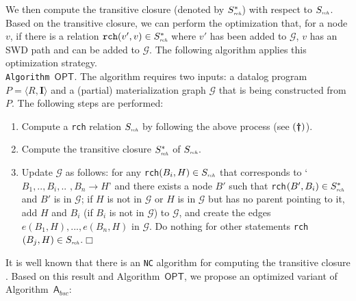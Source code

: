 \documentclass[final,1p,times]{elsarticle}
\begin{document}
We then compute the transitive closure (denoted by $S^*_{\textit{\tiny rch}}$) with respect to
$S_{\textit{\tiny rch}}$. Based on the transitive closure, we can perform the optimization that,
for a node $v$, if there is a relation $\texttt{rch}(v',v)\in S^*_{\textit{\tiny rch}}$
where $v'$ has been added to $\mathcal{G}$, $v$ has an SWD path and can be added to $\mathcal{G}$.
The following algorithm applies this optimization strategy.\\

\noindent\texttt{Algorithm~$\mathsf{OPT}$}. The algorithm requires two inputs:
a datalog program $P=\langle R, \textbf{I}\rangle$ and a (partial) materialization graph $\mathcal{G}$ that is
being constructed from $P$. The following steps are performed:
\begin{enumerate}[leftmargin=6ex,label=(\textbf{\roman*})]
\item Compute a \texttt{rch} relation $S_{\textit{\tiny rch}}$ by following the above process (see $(\textbf{\dag})$).\label{rch}
\item Compute the transitive closure $S^*_{\textit{\tiny rch}}$ of $S_{\textit{\tiny rch}}$.\label{transClos}
\item Update $\mathcal{G}$ as follows: for any \texttt{rch}$(B_i,H)\in S_{\textit{\tiny rch}}$
that corresponds to `$B_1,..,B_i,..$ $,B_n\rightarrow H$'
    and there exists a node $B'$ such that \texttt{rch}$(B',B_i)\in S^*_{\textit{\tiny rch}}$ and $B'$ is
    in $\mathcal{G}$; if $H$ is not in $\mathcal{G}$ or $H$ is in $\mathcal{G}$ but has no parent pointing
    to it, add $H$ and $B_i$ (if $B_i$ is not in $\mathcal{G}$) to $\mathcal{G}$, and create the edges
    $e(B_1, H),...,e(B_n, H)$ in $\mathcal{G}$. Do nothing for other statements
    \texttt{rch}$(B_j,H)\in S_{\textit{\tiny rch}}$.\label{updateG}\hfill$\Box$
\end{enumerate}

It is well known that there is an \texttt{NC} algorithm for computing the
transitive closure \cite{Allender07}.
Based on this result and Algorithm~$\mathsf{OPT}$, we propose an optimized variant of Algorithm~$\mathsf{A}_{bsc}$:\\
\end{document}
